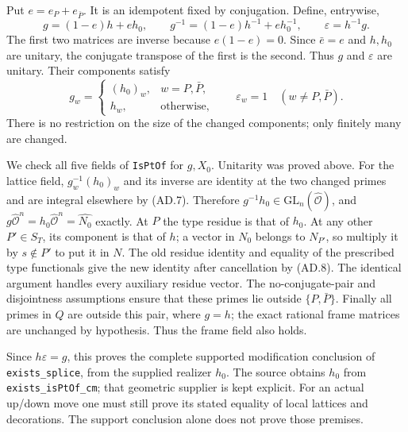Put $e=e_P+e_{\bar P}$. It is an idempotent fixed by conjugation.
Define, entrywise,
\[
 g=(1-e)h+eh_0,\qquad
 g^{-1}=(1-e)h^{-1}+eh_0^{-1},\qquad
 \varepsilon=h^{-1}g.                                \tag{AD.9}
\]
The first two matrices are inverse because $e(1-e)=0$.
Since $\bar e=e$ and $h,h_0$ are unitary, the conjugate
transpose of the first is the second. Thus $g$ and
$\varepsilon$ are unitary. Their components satisfy
\[
 g_w=\begin{cases}(h_0)_w,&w=P,\bar P,\\h_w,&\text{otherwise},
       \end{cases}
 \qquad \varepsilon_w=1\quad(w\ne P,\bar P).          \tag{AD.10}
\]
There is no restriction on the size of the changed components;
only finitely many are changed.

We check all five fields of \texttt{IsPtOf} for $g,X_0$.
Unitarity was proved above. For the lattice field,
$g_w^{-1}(h_0)_w$ and its inverse are identity at the two
changed primes and are integral elsewhere by (AD.7).
Therefore $g^{-1}h_0\in\mathrm{GL}_n(\widehat{\mathcal O})$,
and $g\widehat{\mathcal O}^n=h_0\widehat{\mathcal O}^n
=\widehat{N_0}$ exactly.
At $P$ the type residue is that of $h_0$. At any other
$P'\in S_T$, its component is that of $h$; a vector in
$N_0$ belongs to $N_{P'}$, so multiply it by $s\notin P'$
to put it in $N$. The old residue identity and equality
of the prescribed type functionals give the new identity
after cancellation by (AD.8).
The identical argument handles every auxiliary residue vector.
The no-conjugate-pair and disjointness assumptions ensure that
these primes lie outside $\{P,\bar P\}$. Finally all primes
in $Q$ are outside this pair, where $g=h$; the exact rational
frame matrices are unchanged by hypothesis. Thus the frame
field also holds.

Since $h\varepsilon=g$, this proves the complete supported
modification conclusion of \texttt{exists\_splice}, from
the supplied realizer $h_0$. The source obtains $h_0$ from
\texttt{exists\_isPtOf\_cm}; that geometric supplier is
kept explicit. For an actual up/down move one must still
prove its stated equality of local lattices and decorations.
The support conclusion alone does not prove those premises.

